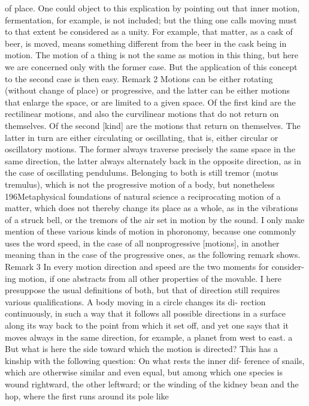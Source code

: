 of place. One could object to this explication by pointing out that inner
motion, fermentation, for example, is not included; but the thing one
calls moving must to that extent be considered as a unity. For example,
that matter, as a cask of beer, is moved, means something different from
the beer in the cask being in motion. The motion of a thing is not the same
as motion in this thing, but here we are concerned only with the former
case. But the application of this concept to the second case is then easy.
Remark 2
Motions can be either rotating (without change of place) or progressive,
and the latter can be either motions that enlarge the space, or are limited
to a given space. Of the ﬁrst kind are the rectilinear motions, and also the
curvilinear motions that do not return on themselves. Of the second [kind]
are the motions that return on themselves. The latter in turn are either
circulating or oscillating, that is, either circular or oscillatory motions. The
former always traverse precisely the same space in the same direction,
the latter always alternately back in the opposite direction, as in the
case of oscillating pendulums. Belonging to both is still tremor (motus
tremulus), which is not the progressive motion of a body, but nonetheless
196Metaphysical foundations of natural science
a reciprocating motion of a matter, which does not thereby change its
place as a whole, as in the vibrations of a struck bell, or the tremors of
the air set in motion by the sound. I only make mention of these various
kinds of motion in phoronomy, because one commonly uses the word
speed, in the case of all nonprogressive [motions], in another meaning
than in the case of the progressive ones, as the following remark shows.
Remark 3
In every motion direction and speed are the two moments for consider-
ing motion, if one abstracts from all other properties of the movable. I
here presuppose the usual deﬁnitions of both, but that of direction still
requires various qualiﬁcations. A body moving in a circle changes its di-
rection continuously, in such a way that it follows all possible directions
in a surface along its way back to the point from which it set off, and yet
one says that it moves always in the same direction, for example, a planet
from west to east. a
But what is here the side toward which the motion is directed? This
has a kinship with the following question: On what rests the inner dif-
ference of snails, which are otherwise similar and even equal, but among
which one species is wound rightward, the other leftward; or the winding
of the kidney bean and the hop, where the ﬁrst runs around its pole like
